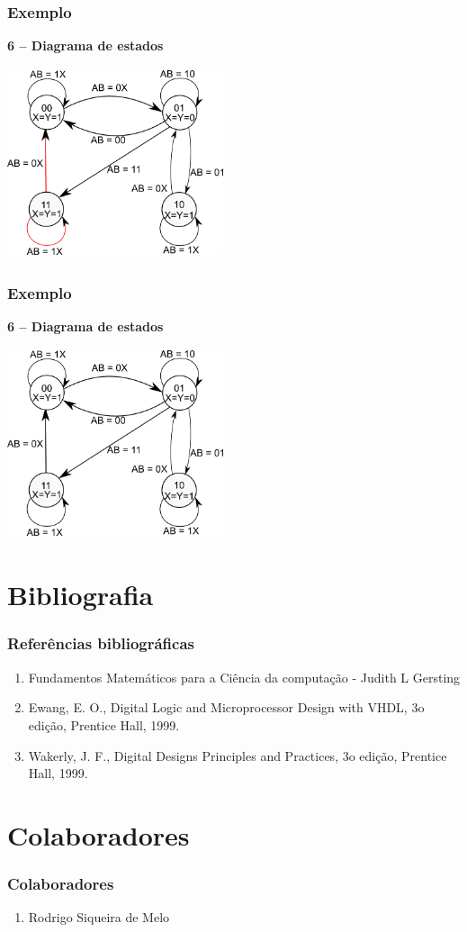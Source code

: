 \documentclass{beamer}
\begin{document}
\begin{frame}
  \frametitle{Exemplo}
  \textbf{6 – Diagrama de estados}
  \begin{center}
   \includegraphics[height = 2.2in, width = 2.5in]{Diagrama_de_estado_ex6.png}
  \end{center}
\end{frame}

\begin{frame}
  \frametitle{Exemplo}
  \textbf{6 – Diagrama de estados}
  \begin{center}
   \includegraphics[height = 2.2in, width = 2.5in]{Diagrama_de_estado_ex7.png}
  \end{center}
\end{frame}


\section{Bibliografia}
\begin{frame}
 \frametitle{Referências bibliográficas}
 \begin{enumerate}
  \item Fundamentos Matemáticos para a Ciência da computação - Judith L Gersting
  \item Ewang, E. O., Digital Logic and Microprocessor Design with VHDL, 3o edição, Prentice Hall, 1999.
  \item Wakerly, J. F., Digital Designs Principles and Practices, 3o edição, Prentice Hall, 1999.
 \end{enumerate}
\end{frame}

\section{Colaboradores}
\begin{frame}
 \frametitle{Colaboradores}
 \begin{enumerate}
  \item Rodrigo Siqueira de Melo
 \end{enumerate}
\end{frame}
\end{document}
